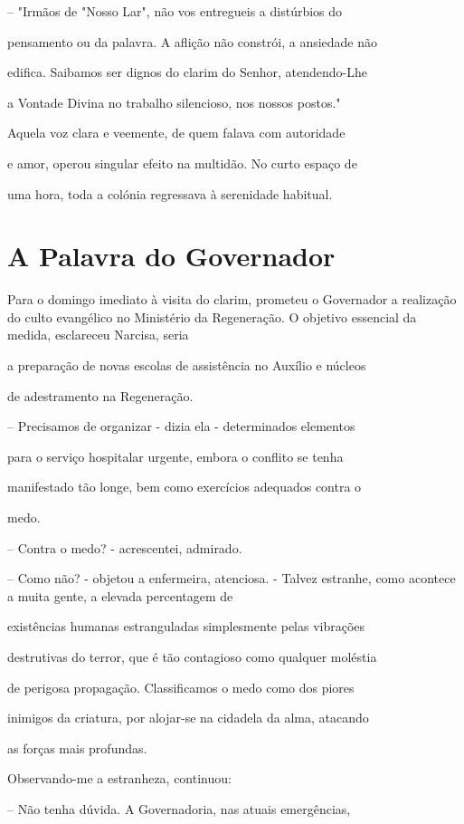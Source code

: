 \documentclass[portuguese,12pt,a4paper]{scrbook}
\begin{document}
	– "Irmãos de "Nosso Lar", não vos entregueis a distúrbios do
	
	pensamento ou da palavra. A aflição não constrói, a ansiedade não
	
	
	edifica. Saibamos ser dignos do clarim do Senhor, atendendo-Lhe
	
	a Vontade Divina no trabalho silencioso, nos nossos postos."
	
	Aquela voz clara e veemente, de quem falava com autoridade
	
	e amor, operou singular efeito na multidão. No curto espaço de
	
	uma hora, toda a colónia regressava à serenidade habitual.
	
	
	\chapter{A Palavra do Governador}
	
	Para o domingo imediato à visita do clarim, prometeu o Governador a realização do culto evangélico no Ministério da Regeneração. O objetivo essencial da medida, esclareceu Narcisa, seria
	
	a preparação de novas escolas de assistência no Auxílio e núcleos
	
	de adestramento na Regeneração.
	
	– Precisamos de organizar - dizia ela - determinados elementos
	
	para o serviço hospitalar urgente, embora o conflito se tenha
	
	manifestado tão longe, bem como exercícios adequados contra o
	
	medo.
	
	– Contra o medo? - acrescentei, admirado.
	
	– Como não? - objetou a enfermeira, atenciosa. - Talvez estranhe, como acontece a muita gente, a elevada percentagem de
	
	existências humanas estranguladas simplesmente pelas vibrações
	
	destrutivas do terror, que é tão contagioso como qualquer moléstia
	
	de perigosa propagação. Classificamos o medo como dos piores
	
	inimigos da criatura, por alojar-se na cidadela da alma, atacando
	
	as forças mais profundas.
	
	Observando-me a estranheza, continuou:
	
	– Não tenha dúvida. A Governadoria, nas atuais emergências,
	
\end{document}
